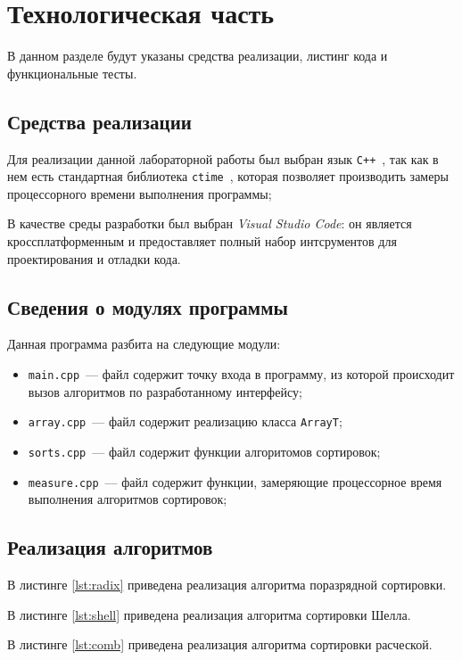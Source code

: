 \chapter{Технологическая часть}
В данном разделе будут указаны средства реализации, листинг кода и функциональные тесты.

\section{Средства реализации}
Для реализации данной лабораторной работы был выбран язык \texttt{C++}~\cite{cpp-lang}, так как в нем есть стандартная библиотека \texttt{ctime}~\cite{cpp-lang}, которая позволяет производить замеры процессорного времени выполнения программы;

В качестве среды разработки был выбран \textit{Visual Studio Code}: он является кроссплатформенным и предоставляет полный набор интсрументов для проектирования и отладки кода.
 
\section{Сведения о модулях программы}
Данная программа разбита на следующие модули:

\begin{itemize}
	\item \texttt{main.cpp}~--- файл содержит точку входа в программу, из которой происходит вызов алгоритмов по разработанному интерфейсу;
	\item \texttt{array.cpp}~--- файл содержит реализацию класса \texttt{ArrayT};
	\item \texttt{sorts.cpp}~--- файл содержит функции алгоритомов сортировок;
	\item \texttt{measure.cpp}~--- файл содержит функции, замеряющие процессорное время выполнения алгоритмов сортировок;
\end{itemize}

\section{Реализация алгоритмов}
В листинге \ref{lst:radix} приведена реализация алгоритма поразрядной сортировки.

В листинге \ref{lst:shell} приведена реализация алгоритма сортировки Шелла.

В листинге \ref{lst:comb} приведена реализация алгоритма сортировки расческой.



